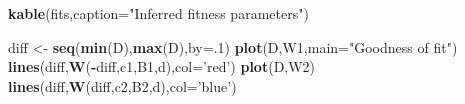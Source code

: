 \documentclass[]{article}
\newenvironment{Shaded}{\begin{snugshade}}{\end{snugshade}}
\newcommand{\DataTypeTok}[1]{\textcolor[rgb]{0.13,0.29,0.53}{#1}}
\newcommand{\DecValTok}[1]{\textcolor[rgb]{0.00,0.00,0.81}{#1}}
\newcommand{\KeywordTok}[1]{\textcolor[rgb]{0.13,0.29,0.53}{\textbf{#1}}}
\newcommand{\NormalTok}[1]{#1}
\newcommand{\OperatorTok}[1]{\textcolor[rgb]{0.81,0.36,0.00}{\textbf{#1}}}
\newcommand{\StringTok}[1]{\textcolor[rgb]{0.31,0.60,0.02}{#1}}
\begin{document}
\begin{Shaded}
\begin{Highlighting}[]
\KeywordTok{kable}\NormalTok{(fits,}\DataTypeTok{caption=}\StringTok{"Inferred fitness parameters"}\NormalTok{)}

\NormalTok{diff <-}\StringTok{ }\KeywordTok{seq}\NormalTok{(}\KeywordTok{min}\NormalTok{(D),}\KeywordTok{max}\NormalTok{(D),}\DataTypeTok{by=}\NormalTok{.}\DecValTok{1}\NormalTok{)}
\KeywordTok{plot}\NormalTok{(D,W1,}\DataTypeTok{main=}\StringTok{"Goodness of fit"}\NormalTok{)}
\KeywordTok{lines}\NormalTok{(diff,}\KeywordTok{W}\NormalTok{(}\OperatorTok{-}\NormalTok{diff,c1,B1,d),}\DataTypeTok{col=}\StringTok{'red'}\NormalTok{)}
\KeywordTok{plot}\NormalTok{(D,W2)}
\KeywordTok{lines}\NormalTok{(diff,}\KeywordTok{W}\NormalTok{(diff,c2,B2,d),}\DataTypeTok{col=}\StringTok{'blue'}\NormalTok{)}
\end{Highlighting}
\end{Shaded}
\end{document}
